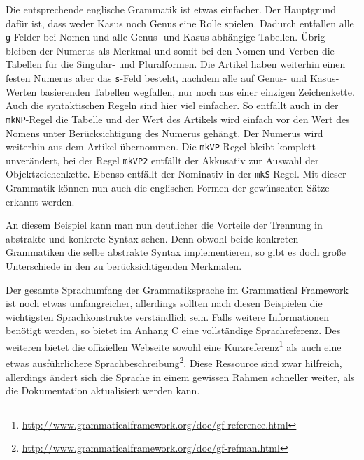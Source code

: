 Die entsprechende englische Grammatik ist etwas einfacher. Der Hauptgrund dafür ist, dass weder Kasus noch Genus eine Rolle spielen. Dadurch entfallen alle \texttt{g}-Felder bei Nomen und alle Genus- und Kasus-abhängige Tabellen. Übrig bleiben der Numerus als Merkmal und somit bei den Nomen und Verben die Tabellen für die Singular- und Pluralformen. Die Artikel haben weiterhin einen festen Numerus aber das \texttt{s}-Feld besteht, nachdem alle auf Genus- und Kasus-Werten basierenden Tabellen wegfallen, nur noch aus einer einzigen Zeichenkette. Auch die syntaktischen Regeln sind hier viel einfacher. So entfällt auch in der \texttt{mkNP}-Regel die Tabelle und der Wert des Artikels wird einfach vor den Wert des Nomens unter Berücksichtigung des Numerus gehängt. Der Numerus wird weiterhin aus dem Artikel übernommen. Die \texttt{mkVP}-Regel bleibt komplett unverändert, bei der Regel \texttt{mkVP2} entfällt der Akkusativ zur Auswahl der Objektzeichenkette. Ebenso entfällt der Nominativ in der \texttt{mkS}-Regel. Mit dieser Grammatik können nun auch die englischen Formen der gewünschten Sätze erkannt werden. \par
An diesem Beispiel kann man nun deutlicher die Vorteile der Trennung in abstrakte und konkrete Syntax sehen. Denn obwohl beide konkreten Grammatiken die selbe abstrakte Syntax implementieren, so gibt es doch große Unterschiede in den zu berücksichtigenden Merkmalen. \par
Der gesamte Sprachumfang der Grammatiksprache im Grammatical Framework ist noch etwas umfangreicher, allerdings sollten nach diesen Beispielen die wichtigsten Sprachkonstrukte verständlich sein. Falls weitere Informationen benötigt werden, so bietet \cite{RANTA2011} im Anhang C eine vollständige Sprachreferenz. Des weiteren bietet die offiziellen Webseite sowohl eine Kurzreferenz\footnote{\url{http://www.grammaticalframework.org/doc/gf-reference.html}} als auch eine etwas ausführlichere Sprachbeschreibung\footnote{\url{http://www.grammaticalframework.org/doc/gf-refman.html}}. Diese Ressource sind zwar hilfreich, allerdings ändert sich die Sprache in einem gewissen Rahmen schneller weiter, als die Dokumentation aktualisiert werden kann.
\FloatBarrier
